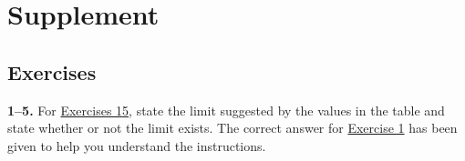 \documentclass[10pt,oneside,]{book}
\theoremstyle{plain}
\theoremstyle{definition}
\numberwithin{equation}{section}
\begin{document}
\section[Supplement]{Supplement}\label{limits-and-continuity-supplementary-exercises}
\typeout{************************************************}
\typeout{************************************************}
\subsection[Exercises]{Exercises}\label{exercises-18}
\textbf{1--5. }\hypertarget{exercisegroup-31}{\null}For \hyperlink{exercise-limits-supplement-first}{Exercises 1}\textendash{}\hyperlink{exercise-limits-supplement-last}{5}, state the limit suggested by the values in the table and state whether or not the limit exists.  The correct answer for \hyperlink{exercise-limits-supplement-first}{Exercise 1} has been given to help you understand the instructions.%
\par
\end{document}
